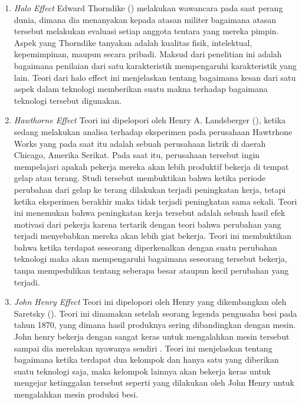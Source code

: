 	\begin{enumerate}
		\item \textit{Halo Effect}
			\subitem Edward Thorndike (\citeyear{paper.thorndike}) melakukan wawancara pada saat perang dunia, dimana dia menanyakan kepada atasan militer bagaimana atasan tersebut melakukan evaluasi setiap anggota tentara yang mereka pimpin. Aspek yang Thorndike tanyakan adalah kualitas fisik, intelektual, kepemimpinan, maupun secara pribadi. Maksud dari penelitian ini adalah bagaimana penilaian dari satu karakteristik mempengaruhi karakteristik yang lain. Teori dari halo effect ini menjelaskan tentang bagaimana kesan dari satu aspek dalam teknologi memberikan suatu makna terhadap bagaimana teknologi tersebut digunakan.
		\item \textit{Hawthorne Effect}
			\subitem Teori ini dipelopori oleh Henry A. Landsberger (\citeyear{paper.landsberger}), ketika sedang melakukan analisa terhadap eksperimen pada perusahaan Hawtrhone Works yang pada saat itu adalah sebuah perusahaan listrik di daerah Chicago, Amerika Serikat. Pada saat itu, perusahaan tersebut ingin mempelajari apakah pekerja mereka akan lebih produktif bekerja di tempat gelap atau terang. Studi tersebut membuktikan bahwa ketika periode perubahan dari gelap ke terang dilakukan terjadi peningkatan kerja, tetapi ketika eksperimen berakhir maka tidak terjadi peningkatan sama sekali. Teori ini menemukan bahwa peningkatan kerja tersebut adalah sebuah hasil efek motivasi dari pekerja karena tertarik dengan teori bahwa perubahan yang terjadi menyebabkan mereka akan lebih giat bekerja. Teori ini membuktikan bahwa ketika terdapat seseorang diperkenalkan dengan suatu perubahan teknologi maka akan mempengaruhi bagaimana seseorang tersebut bekerja, tanpa mempedulikan tentang seberapa besar ataupun kecil perubahan yang terjadi.
		\item \textit{John Henry Effect}
			\subitem Teori ini dipelopori oleh Henry yang dikembangkan oleh Saretsky (\citeyear{paper.Saretsky}). Teori ini dinamakan setelah seorang legenda pengusaha besi pada tahun 1870, yang dimana hasil produknya sering dibandingkan dengan mesin. John henry bekerja dengan sangat keras untuk mengalahkan mesin tersebut sampai dia merelakan nyawanya sendiri . Teori ini menjelaskan tentang bagaimana ketika terdapat dua kelompok dan hanya satu yang diberikan suatu teknologi saja, maka kelompok lainnya akan bekerja keras untuk mengejar ketinggalan tersebut seperti yang dilakukan oleh John Henry untuk mengalahkan mesin produksi besi.
	\end{enumerate}
